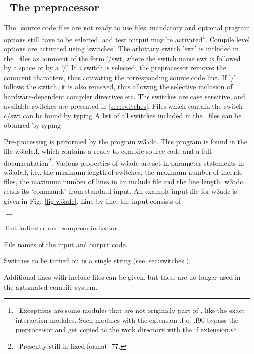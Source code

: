 \vssub
\subsection{~The preprocessor} \label{sec:w3adc}
\vssub

The \ws\ source code files are not ready to use {\fortran} files; mandatory
and optional program options still have to be selected, and test output may be
activated\footnote{~Exceptions are some modules that are not originally part
  of \ws, like the exact interaction modules. Such modules with the extension
  {\file .f} of {\file .f90} bypass the preprocessor and get copied to the
  work directory with the {\file .f} extension.}. Compile level options are
activated using `switches'. The arbitrary switch '{\F swt}' is included in the
\ws\ files as comment of the form {\F !/swt}, where the switch name {\F swt}
is followed by a space or by a '{\F /}'. If a switch is selected, the
preprocessor removes the comment characters, thus activating the corresponding
source code line. If '{\F/}' follows the switch, it is also removed, thus
allowing the selective inclusion of hardware-dependent compiler directives
etc. The switches are case sensitive, and available switches are presented in
\para\ref{sec:switches}. Files which contain the switch {\F c/swt} can be
found by typing  A list of all switches included
in the \ws\ files can be obtained by typing 

\pb
\noindent
Pre-processing is performed by the program {\code w3adc}. This program is
found in the file {\file w3adc.f}, which contains a ready to compile
{\fortran} source code and a full documentation\footnote{~Presently still in
  fixed-format {\fortran}-77.}. Various properties of {\code w3adc} are set in
{\F parameter} statements in {\file w3adc.f}, i.e., the maximum length of
switches, the maximum number of include files, the maximum number of lines in
an include file and the line length. {\code w3adc} reads its `commands' from
standard input. An example input file for {\code w3adc} is given in
Fig.~\ref{fig:w3adc}. Line-by-line, the input consists of

\begin{list}{$\rightarrow$}{\itemsep 0mm \parsep 0mm}
\item	Test indicator and compress indicator.
\item	File names of the input and output code.
\item	Switches to be turned on in a single string (see
          \para\ref{sec:switches}).
\item   Additional lines with include files can be given, but these are no
        longer used in the automated compile system.
\end{list}

